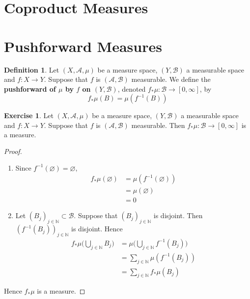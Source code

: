 \documentclass{book}
\theoremstyle{definition}
\newtheorem{defn}[definition]{Definition}
\newtheorem{ex}[definition]{Exercise}
\newcommand{\N}{\mathbb{N}}
\newcommand{\MA}{\mathcal{A}}
\newcommand{\MB}{\mathcal{B}}
\DeclareMathOperator*{\0}{\mbf{0}}
\DeclareMathOperator*{\1}{\mbf{1}}
\newcommand{\RG}{[0,\infty]}
\begin{document}
\newpage
\section{Coproduct Measures}
































	\newpage
	\section{Pushforward Measures}
	
	\begin{defn}
		Let $(X, \MA, \mu)$ be a measure space, $(Y, \MB)$ a measurable space and $f: X \rightarrow Y$. Suppose that $f$ is $(\MA, \MB)$ measurable. We define the \textbf{pushforward of $\mu$ by $f$ on $(Y, \MB)$}, denoted $f_*\mu: \MB \rightarrow [0, \infty]$, by $$f_*\mu(B) = \mu(f^{-1}(B))$$
	\end{defn}

	\begin{ex}
		Let $(X, \MA, \mu)$ be a measure space, $(Y, \MB)$ a measurable space and $f: X \rightarrow Y$. Suppose that $f$ is $(\MA, \MB)$ measurable. Then $f_*\mu: \MB \rightarrow \RG$ is a measure.
	\end{ex}

	\begin{proof}\
		\begin{enumerate}
			\item Since $f^{-1}(\varnothing) = \varnothing$, 
			\begin{align*}
				f_*\mu(\varnothing) 
				& = \mu(f^{-1}(\varnothing)) \\
				& = \mu(\varnothing) \\
				& = 0
			\end{align*}
			\item Let $(B_j)_{j \in \N} \subset \MB$. Suppose that $(B_j)_{j \in \N}$ is disjoint. Then $(f^{-1}(B_j))_{j \in \N}$ is disjoint. Hence 
			\begin{align*}
				f_*\mu \bigg( \bigcup_{j \in \N} B_j \bigg)
				& = \mu \bigg( \bigcup_{j \in \N} f^{-1}(B_j) \bigg) \\
				& = \sum_{j \in \N} \mu(f^{-1}(B_j)) \\
				& = \sum_{j \in \N} f_*\mu(B_j)
			\end{align*}
		\end{enumerate}
		Hence $f_* \mu$ is a measure.
	\end{proof}
	
\end{document}
